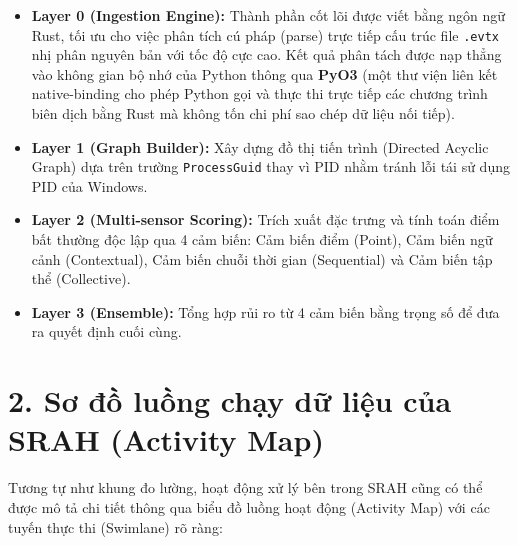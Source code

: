 \documentclass[../main.tex]{subfiles}
\begin{document}
\begin{itemize}
    \item \textbf{Layer 0 (Ingestion Engine):} Thành phần cốt lõi được viết bằng ngôn ngữ Rust, tối ưu cho việc phân tích cú pháp (parse) trực tiếp cấu trúc file \texttt{.evtx} nhị phân nguyên bản với tốc độ cực cao. Kết quả phân tách được nạp thẳng vào không gian bộ nhớ của Python thông qua \textbf{PyO3} (một thư viện liên kết native-binding cho phép Python gọi và thực thi trực tiếp các chương trình biên dịch bằng Rust mà không tốn chi phí sao chép dữ liệu nối tiếp).
    \item \textbf{Layer 1 (Graph Builder):} Xây dựng đồ thị tiến trình (Directed Acyclic Graph) dựa trên trường \texttt{ProcessGuid} thay vì PID nhằm tránh lỗi tái sử dụng PID của Windows.
    \item \textbf{Layer 2 (Multi-sensor Scoring):} Trích xuất đặc trưng và tính toán điểm bất thường độc lập qua 4 cảm biến: Cảm biến điểm (Point), Cảm biến ngữ cảnh (Contextual), Cảm biến chuỗi thời gian (Sequential) và Cảm biến tập thể (Collective).
    \item \textbf{Layer 3 (Ensemble):} Tổng hợp rủi ro từ 4 cảm biến bằng trọng số để đưa ra quyết định cuối cùng.
\end{itemize}

\section*{2. Sơ đồ luồng chạy dữ liệu của SRAH (Activity Map)}

Tương tự như khung đo lường, hoạt động xử lý bên trong SRAH cũng có thể được mô tả chi tiết thông qua biểu đồ luồng hoạt động (Activity Map) với các tuyến thực thi (Swimlane) rõ ràng:
\end{document}
